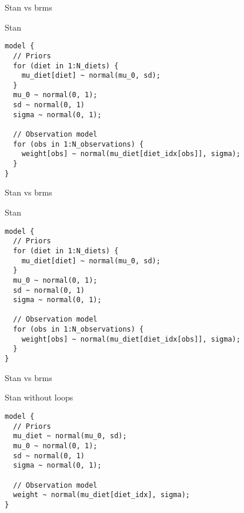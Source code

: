 \documentclass[finnish,english,t]{beamer}
\begin{document}
\begin{frame}[fragile]{Stan vs brms}

  \vspace{-0.5\baselineskip}

  Stan
  
{\small
\begin{verbatim}
model {
  // Priors
  for (diet in 1:N_diets) {
    mu_diet[diet] ~ normal(mu_0, sd);
  }
  mu_0 ~ normal(0, 1);
  sd ~ normal(0, 1)
  sigma ~ normal(0, 1);
  
  // Observation model
  for (obs in 1:N_observations) {
    weight[obs] ~ normal(mu_diet[diet_idx[obs]], sigma);
  }
}
\end{verbatim}
}
\end{frame}

\begin{frame}[fragile]{Stan vs brms}

  \vspace{-0.5\baselineskip}

  Stan
  
{\small
\begin{verbatim}
model {
  // Priors
  for (diet in 1:N_diets) {
    mu_diet[diet] ~ normal(mu_0, sd);
  }
  mu_0 ~ normal(0, 1);
  sd ~ normal(0, 1)
  sigma ~ normal(0, 1);
  
  // Observation model
  for (obs in 1:N_observations) {
    weight[obs] ~ normal(mu_diet[diet_idx[obs]], sigma);
  }
}
\end{verbatim}
}
\end{frame}

\begin{frame}[fragile]{Stan vs brms}

  \vspace{-0.5\baselineskip}

  Stan without loops
  
{\small
\begin{verbatim}
model {
  // Priors
  mu_diet ~ normal(mu_0, sd);
  mu_0 ~ normal(0, 1);
  sd ~ normal(0, 1)
  sigma ~ normal(0, 1);
  
  // Observation model
  weight ~ normal(mu_diet[diet_idx], sigma);
}
\end{verbatim}
}

\end{frame}
\end{document}
